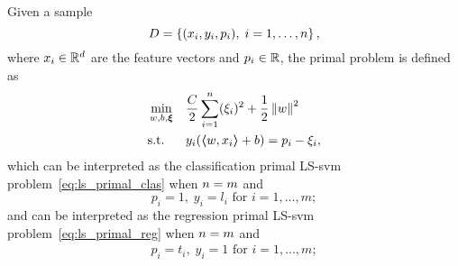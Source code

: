 \begin{definition}
    Given a sample
    $$ D = \left\{(x_i, y_i, p_i), \; i=1, \ldots, n\right\} ,$$
    where $x_i \in \mathbb{R}^d$ are the feature vectors and $p_i \in \mathbb{R}$, 
    the primal problem is defined as
    \begin{equation}
        \label{eq:ls_primal}
        \begin{aligned}
            &\min_{w, b, \fv{\xi}} & & \frac{C}{2} \sum_{i=1}^\nsamples (\xi_i)^2 + \frac{1}{2} \norm{w}^2 \\
            & \text{s.t.} & & y_i (\dotp{w}{x_i} + b) = p_i - \xi_i ,     
        \end{aligned}  
    \end{equation}
    which can be interpreted as the classification primal LS-\acrshort{svm} problem~\eqref{eq:ls_primal_clas} when $n=m$ and
    $$ p_i = 1,\; y_i = l_i \text{ for } i=1, \ldots, m ;$$
    and can be interpreted as the regression primal LS-\acrshort{svm} problem~\eqref{eq:ls_primal_reg} when $n = m$ and
    \begin{equation}
        \nonumber
        \begin{aligned}
            p_i = t_i  ,\; y_i = 1 \text{ for } i=1, \ldots, m ; \\
        \end{aligned}
    \end{equation}
\end{definition}
%
